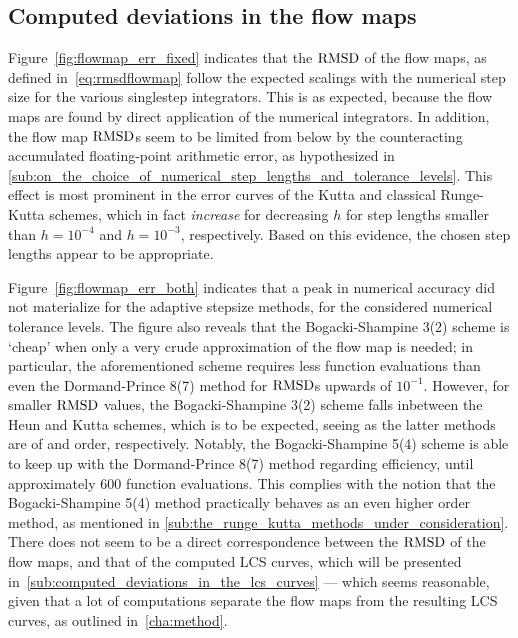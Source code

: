 \subsection{Computed deviations in the flow maps}
\label{sub:computed_deviations_in_the_flow_maps}
Figure~\ref{fig:flowmap_err_fixed} indicates that the $\operatorname{RMSD}$ of the flow maps,
as defined in~\cref{eq:rmsdflowmap} follow the expected scalings with the
numerical step size for the various singlestep integrators. This is as expected,
because the flow maps are found by direct application of the numerical
integrators. In addition, the flow map $\operatorname{RMSD}$s seem to be limited from below
by the counteracting accumulated floating-point arithmetic error, as
hypothesized in
\cref{sub:on_the_choice_of_numerical_step_lengths_and_tolerance_levels}.
This effect is most prominent in the error curves of the Kutta and
classical Runge-Kutta schemes, which in fact \emph{increase} for decreasing
$h$ for step lengths smaller than $h=10^{-4}$ and $h=10^{-3}$, respectively.
Based on this evidence, the chosen step lengths appear to be appropriate.

Figure~\ref{fig:flowmap_err_both} indicates that a peak in numerical accuracy
did not materialize for the adaptive stepsize methods, for the considered
numerical tolerance levels. The figure also reveals that the Bogacki-Shampine
3(2) scheme is `cheap' when only a very crude approximation of the flow map is
needed; in particular, the aforementioned scheme requires less function
evaluations than even the Dormand-Prince 8(7) method for $\operatorname{RMSD}$s upwards of
$10^{-1}$. However, for smaller $\operatorname{RMSD}$ values, the Bogacki-Shampine 3(2)
scheme falls inbetween the Heun and Kutta schemes, which is to be expected,
seeing as the latter methods are of  and  order, respectively.
Notably, the Bogacki-Shampine 5(4) scheme is able to keep up with the
Dormand-Prince 8(7) method regarding efficiency, until approximately $600$
function evaluations. This complies with the notion that the Bogacki-Shampine
5(4) method practically behaves as an even higher order method, as mentioned in
\cref{sub:the_runge_kutta_methods_under_consideration}.
There does not seem to be a direct correspondence between the
$\operatorname{RMSD}$ of the flow maps, and that of the computed LCS curves, which will be
presented in~\cref{sub:computed_deviations_in_the_lcs_curves} --- which seems
reasonable, given that a lot of computations separate the flow maps from the
resulting LCS curves, as outlined in~\cref{cha:method}.




